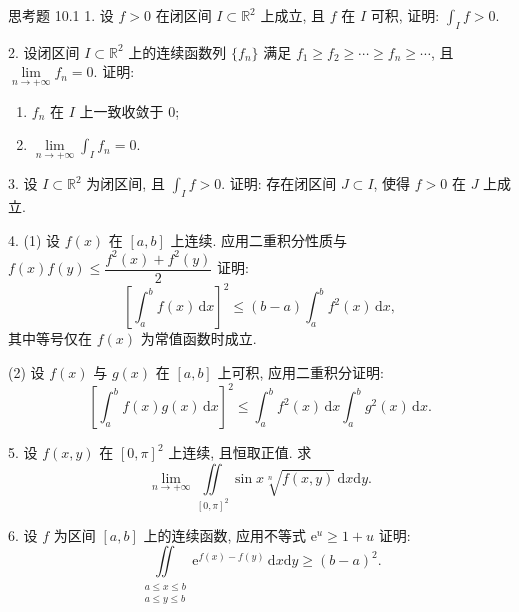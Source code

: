 \begin{exblock}{思考题 10.1}
1. 设 $f > 0$ 在闭区间 $I \subset \mathbb{R}^{2}$ 上成立, 且 $f$ 在 $I$ 可积, 证明: $\displaystyle\int_{I} f > 0$.

2. 设闭区间 $I \subset \mathbb{R}^2$ 上的连续函数列 $\{f_n\}$ 满足 $f_1 \geqslant f_2 \geqslant \cdots \geqslant f_n \geqslant \cdots$, 且 $\lim\limits_{n \to +\infty} f_n = 0$. 证明:
\begin{enumerate}
  \item $f_n$ 在 $I$ 上一致收敛于 0;
  \item $\lim\limits_{n \to +\infty} \displaystyle\int_{I} f_n = 0$.
\end{enumerate}

3. 设 $I \subset \mathbb{R}^{2}$ 为闭区间, 且 $\displaystyle\int_{I} f > 0$. 证明: 存在闭区间 $J \subset I$, 使得 $f > 0$ 在 $J$ 上成立.

4. (1) 设 $f(x)$ 在 $[a, b]$ 上连续. 应用二重积分性质与 $f(x)f(y) \leqslant \dfrac{f^{2}(x)+f^{2}(y)}{2}$ 证明:
\[
  \left[\int_{a}^{b} f(x)\,\mathrm{d}x\right]^{2} \leqslant (b-a)\int_{a}^{b} f^{2}(x)\,\mathrm{d}x,
\]
其中等号仅在 $f(x)$ 为常值函数时成立.

(2) 设 $f(x)$ 与 $g(x)$ 在 $[a, b]$ 上可积, 应用二重积分证明:
\[
  \left[\int_{a}^{b} f(x)g(x)\,\mathrm{d}x\right]^{2} \leqslant \int_{a}^{b} f^{2}(x)\,\mathrm{d}x \int_{a}^{b} g^{2}(x)\,\mathrm{d}x.
\]

5. 设 $f(x, y)$ 在 $[0, \pi]^{2}$ 上连续, 且恒取正值. 求
\[
  \lim_{n \to +\infty} \iint\limits_{[0, \pi]^{2}} \sin x \sqrt[n]{f(x, y)}\,\mathrm{d}x\mathrm{d}y.
\]

6. 设 $f$ 为区间 $[a, b]$ 上的连续函数, 应用不等式 $\mathrm{e}^{u} \geqslant 1 + u$ 证明:
\[
  \iint\limits_{\substack{a \leqslant x \leqslant b \\ a \leqslant y \leqslant b}} \mathrm{e}^{f(x)-f(y)}\,\mathrm{d}x\mathrm{d}y \geqslant (b-a)^{2}.
\]
\end{exblock}
